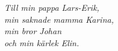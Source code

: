 \pagestyle{empty}

\vspace*{4cm}
\begin{center}
	\textit{Till min pappa Lars-Erik,} \\
	\textit{min saknade mamma Karina,} \\
 	\textit{min bror Johan} \\
 	\textit{och min k\"arlek Elin.}
\end{center}
\vspace*{\fill}